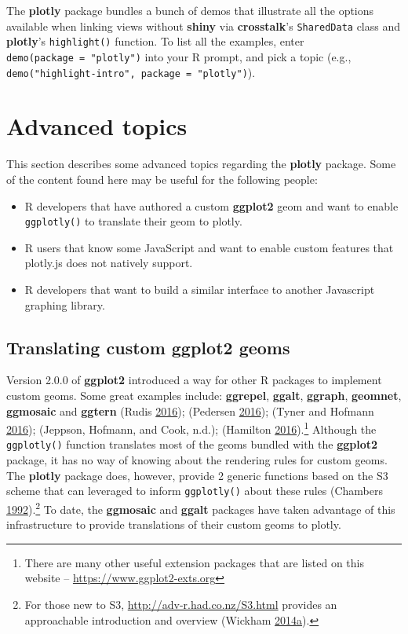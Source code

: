 \documentclass[12pt,]{isuthesis}
\providecommand{\tightlist}{%
  \setlength{\itemsep}{0pt}\setlength{\parskip}{0pt}}
\let\rmarkdownfootnote\footnote%
\def\footnote{\protect\rmarkdownfootnote}
\begin{document}
The \textbf{plotly} package bundles a bunch of demos that illustrate all
the options available when linking views without \textbf{shiny} via
\textbf{crosstalk}'s \texttt{SharedData} class and \textbf{plotly}'s
\texttt{highlight()} function. To list all the examples, enter
\texttt{demo(package\ =\ "plotly")} into your R prompt, and pick a topic
(e.g., \texttt{demo("highlight-intro",\ package\ =\ "plotly")}).

\section{Advanced topics}\label{advanced-topics}

This section describes some advanced topics regarding the
\textbf{plotly} package. Some of the content found here may be useful
for the following people:

\begin{itemize}
\tightlist
\item
  R developers that have authored a custom \textbf{ggplot2} geom and
  want to enable \texttt{ggplotly()} to translate their geom to plotly.
\item
  R users that know some JavaScript and want to enable custom features
  that plotly.js does not natively support.
\item
  R developers that want to build a similar interface to another
  Javascript graphing library.
\end{itemize}

\subsection{Translating custom ggplot2
geoms}\label{translating-custom-ggplot2-geoms}

Version 2.0.0 of \textbf{ggplot2} introduced a way for other R packages
to implement custom geoms. Some great examples include:
\textbf{ggrepel}, \textbf{ggalt}, \textbf{ggraph}, \textbf{geomnet},
\textbf{ggmosaic} and \textbf{ggtern} (Rudis
\protect\hyperlink{ref-ggalt}{2016}); (Pedersen
\protect\hyperlink{ref-ggraph}{2016}); (Tyner and Hofmann
\protect\hyperlink{ref-geomnet}{2016}); (Jeppson, Hofmann, and Cook,
n.d.); (Hamilton \protect\hyperlink{ref-ggtern}{2016}).\footnote{There
  are many other useful extension packages that are listed on this
  website -- \url{https://www.ggplot2-exts.org}} Although the
\texttt{ggplotly()} function translates most of the geoms bundled with
the \textbf{ggplot2} package, it has no way of knowing about the
rendering rules for custom geoms. The \textbf{plotly} package does,
however, provide 2 generic functions based on the S3 scheme that can
leveraged to inform \texttt{ggplotly()} about these rules (Chambers
\protect\hyperlink{ref-S3}{1992}).\footnote{For those new to S3,
  \url{http://adv-r.had.co.nz/S3.html} provides an approachable
  introduction and overview (Wickham
  \protect\hyperlink{ref-adv-r}{2014}\protect\hyperlink{ref-adv-r}{a}).}
To date, the \textbf{ggmosaic} and \textbf{ggalt} packages have taken
advantage of this infrastructure to provide translations of their custom
geoms to plotly.
\end{document}

